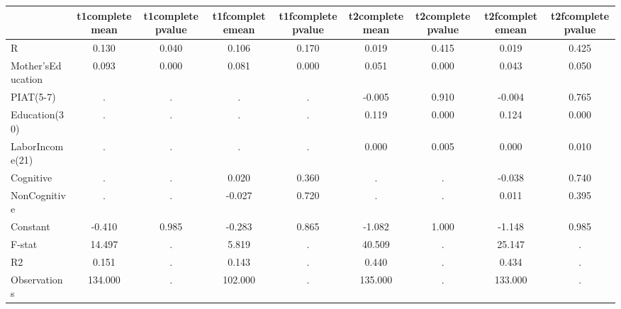 \begin{table}[htbp]
\begin{tabular}{lcccccccc} \hline \hline
 & t1completemean  & t1completepvalue  & t1fcompletemean  & t1fcompletepvalue  & t2completemean  & t2completepvalue  & t2fcompletemean  & t2fcompletepvalue  \\  \hline 
R &     0.130 &     0.040 &     0.106 &     0.170 &     0.019 &     0.415 &     0.019 &     0.425 \\  
Mother'sEducation &     0.093 &     0.000 &     0.081 &     0.000 &     0.051 &     0.000 &     0.043 &     0.050 \\  
PIAT(5-7) &         . &         . &         . &         . &    -0.005 &     0.910 &    -0.004 &     0.765 \\  
Education(30) &         . &         . &         . &         . &     0.119 &     0.000 &     0.124 &     0.000 \\  
LaborIncome(21) &         . &         . &         . &         . &     0.000 &     0.005 &     0.000 &     0.010 \\  
Cognitive &         . &         . &     0.020 &     0.360 &         . &         . &    -0.038 &     0.740 \\  
NonCognitive &         . &         . &    -0.027 &     0.720 &         . &         . &     0.011 &     0.395 \\  
Constant &    -0.410 &     0.985 &    -0.283 &     0.865 &    -1.082 &     1.000 &    -1.148 &     0.985 \\  
F-stat &    14.497 &         . &     5.819 &         . &    40.509 &         . &    25.147 &         . \\  
R2 &     0.151 &         . &     0.143 &         . &     0.440 &         . &     0.434 &         . \\  
Observations &   134.000 &         . &   102.000 &         . &   135.000 &         . &   133.000 &         . \\  
\hline \hline \end{tabular}
\end{table}
